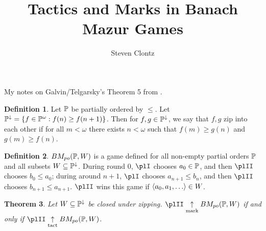 \documentclass[11pt]{article}
\title{Tactics and Marks in Banach Mazur Games}
\author{Steven Clontz}
\theoremstyle{plain}
\newtheorem{theorem}{Theorem}
\theoremstyle{definition}
\newtheorem{definition}[theorem]{Definition}
\theoremstyle{remark}
\theoremstyle{plain}
\theoremstyle{definition}
\theoremstyle{remark}
\newcommand{\bmPoGame}[2]{BM_{po}(#1,#2)}
\begin{document}
\maketitle

  My notes on Galvin/Telgarsky's Theorem 5 from \cite{MR831181}.

  \begin{definition}
    Let \(\mathbb{P}\) be partially ordered by \(\leq\).
    Let \(\mathbb{P}^{\downarrow}=\{f\in\mathbb{P}^\omega : f(n)\geq f(n+1)\}\).
    Then for \(f,g\in\mathbb{P}^\downarrow\), we say that \(f,g\) zip into each
    other if for all \(m<\omega\) there exists \(n<\omega\) such that
    \(f(m)\geq g(n)\) and \(g(m)\geq f(n)\).
  \end{definition}

  \begin{definition}
    \(\bmPoGame{\mb P}{W}\) is a game defined for all non-empty partial orders
    \(\mathbb{P}\) and all subsets \(W\subseteq\mathbb{P}^\downarrow\).
    During round \(0\), \(\plI\) chooses \(a_0\in\mathbb{P}\),
    and then \(\plII\) chooses \(b_0\leq a_0\); during around \(n+1\),
    \(\plI\) chooses \(a_{n+1}\leq b_n\), and then \(\plII\) chooses
    \(b_{n+1}\leq a_{n+1}\). \(\plII\) wins this game if
    \(\<a_0,a_1,\dots\>\in W\).
  \end{definition}

  \begin{theorem}
    Let \(W\subseteq\mathbb{P}^\downarrow\) be closed under zipping.
    \(\plII\markwin\bmPoGame{\mb P}{W}\) if and only if
    \(\plII\tactwin\bmPoGame{\mb P}{W}\).
  \end{theorem}
\end{document}
